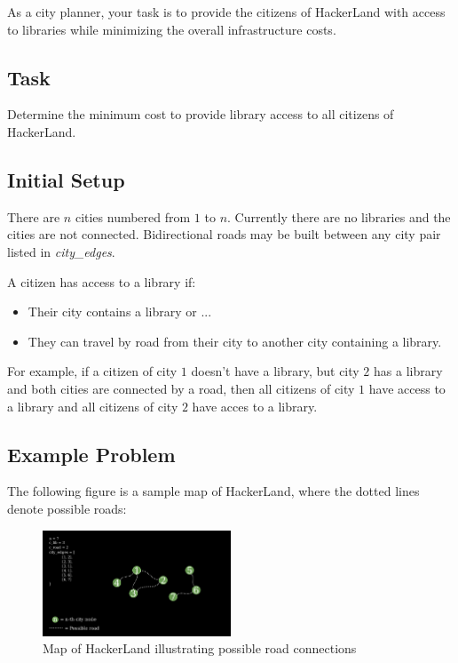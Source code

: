 \documentclass[11pt, a4paper, oneside]{article}
\begin{document}
As a city planner, your task is to provide the citizens of HackerLand with access to libraries while minimizing the overall infrastructure costs.

\subsection*{Task}

Determine the minimum cost to provide library access to all citizens of HackerLand.

\subsection*{Initial Setup}
There are \(n\) cities numbered from \(1\) to \(n\). Currently there are no libraries and the cities are not connected. Bidirectional roads may be built between any city pair listed in \textit{city\_edges}.

A citizen has access to a library if:

\begin{itemize}
  \item Their city contains a library or ...
  \item They can travel by road from their city to another city containing a library.
\end{itemize}

For example, if a citizen of city \(1\) doesn't have a library, but city \(2\) has a library and both cities are connected by a road, then all citizens of city \(1\) have access to a library and all citizens of city \(2\) have acces to a library.

\subsection*{Example Problem}

The following figure is a sample map of HackerLand, where the dotted lines denote possible roads:

\begin{figure}[H]
  \centering
  \includegraphics[width=0.5\textwidth]{hackerland-graph.png}
  \caption{Map of HackerLand illustrating possible road connections}
  \label{fig:image1}
\end{figure}
\end{document}
